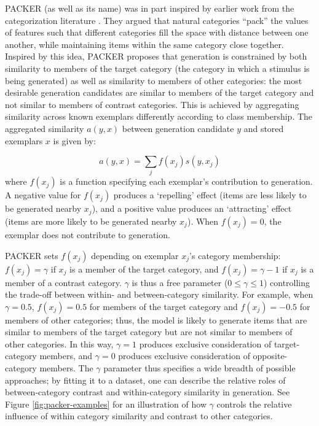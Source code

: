 \documentclass[12pt]{article}
\begin{document}
\begin{flushleft}
PACKER (as well as its name) was in part inspired by earlier work from the categorization literature \citep{hidaka2011packing}. They argued that natural categories ``pack'' the values of features such that different categories fill the space with distance between one another, while maintaining items within the same category close together. Inspired by this idea, PACKER proposes that generation is constrained by both similarity to members of the target category (the category in which a stimulus is being generated) as well as similarity to members of other categories: the most desirable generation candidates are similar to members of the target category and not similar to members of contrast categories. This is achieved by aggregating similarity across known exemplars differently according to class membership. The aggregated similarity $a(y,x)$ between generation candidate $y$ and stored exemplars $x$ is given by:

\begin{equation}
a(y, x) = \sum_j{f(x_j) s(y, x_j)}
\end{equation}
% 
where $f(x_j)$ is a function specifying each exemplar's contribution to generation. A negative value for $f(x_j)$ produces a `repelling' effect (items are less likely to be generated nearby $x_j$), and a positive value produces an `attracting' effect (items are more likely to be generated nearby $x_j$). When $f(x_j)=0$, the exemplar does not contribute to generation. 

PACKER sets $f(x_j)$ depending on exemplar $x_j$'s category membership: $f(x_j) = \gamma$ if $x_j$ is a member of the target category, and $f(x_j) = \gamma - 1$ if $x_j$ is a member of a contrast category. $\gamma$ is thus a free parameter ($0 \leq \gamma \leq 1$) controlling the trade-off between within- and between-category similarity. For example, when $\gamma = 0.5$, $f(x_j) = 0.5$ for members of the target category and $f(x_j) = -0.5$ for members of other categories; thus, the model is likely to generate items that are similar to members of the target category but are not similar to members of other categories. In this way, $\gamma = 1$ produces exclusive consideration of target-category members, and $\gamma = 0$ produces exclusive consideration of opposite-category members. The $\gamma$ parameter thus specifies a wide breadth of possible approaches; by fitting it to a dataset, one can describe the relative roles of between-category contrast and within-category similarity in generation. See Figure \ref{fig:packer-examples} for an illustration of how $\gamma$ controls the relative influence of within category similarity and contrast to other categories.


\end{flushleft}
\end{document}
